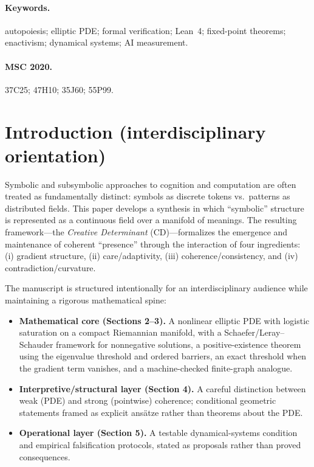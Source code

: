 \documentclass[11pt]{article}
\theoremstyle{plain}
\theoremstyle{definition}
\theoremstyle{remark}
\begin{document}
\paragraph{Keywords.}
autopoiesis; elliptic PDE; formal verification; Lean~4; fixed-point theorems; enactivism; dynamical systems; AI measurement.

\paragraph{MSC 2020.}
37C25; 47H10; 35J60; 55P99.

\section{Introduction (interdisciplinary orientation)}
Symbolic and subsymbolic approaches to cognition and computation are often treated as fundamentally distinct: symbols as discrete tokens vs.\ patterns as distributed fields. This paper develops a synthesis in which ``symbolic'' structure is represented as a continuous field over a manifold of meanings. The resulting framework---the \emph{Creative Determinant} (CD)---formalizes the emergence and maintenance of coherent ``presence'' through the interaction of four ingredients:
(i) gradient structure, (ii) care/adaptivity, (iii) coherence/consistency, and (iv) contradiction/curvature.

The manuscript is structured intentionally for an interdisciplinary audience while maintaining a rigorous mathematical spine:
\begin{itemize}[leftmargin=2em]
\item \textbf{Mathematical core (Sections 2--3).} A nonlinear elliptic PDE with logistic saturation on a compact Riemannian manifold, with a Schaefer/Leray--Schauder framework for nonnegative solutions, a positive-existence theorem using the eigenvalue threshold and ordered barriers, an exact threshold when the gradient term vanishes, and a machine-checked finite-graph analogue.
\item \textbf{Interpretive/structural layer (Section 4).} A careful distinction between weak (PDE) and strong (pointwise) coherence; conditional geometric statements framed as explicit ans\"atze rather than theorems about the PDE.
\item \textbf{Operational layer (Section 5).} A testable dynamical-systems condition and empirical falsification protocols, stated as proposals rather than proved consequences.
\end{itemize}
\end{document}
